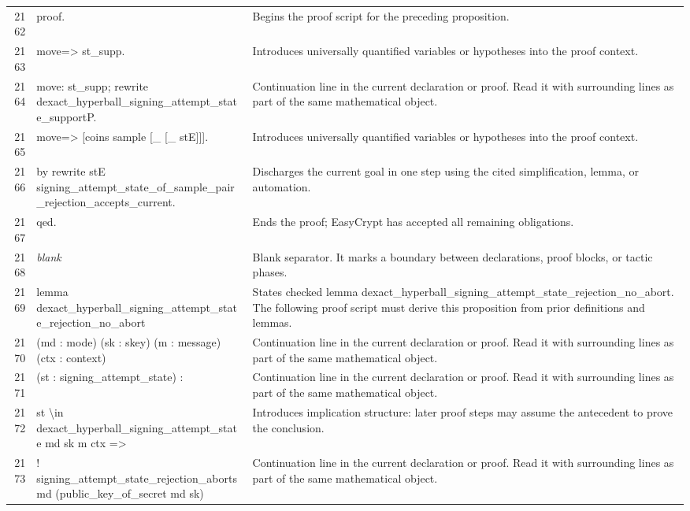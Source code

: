\documentclass[10pt]{article}
\begin{document}
\begin{longtable}{r L{0.53\textwidth} L{0.37\textwidth}}
2162 & {\ttfamily\scriptsize proof.} & Begins the proof script for the preceding proposition. \\
2163 & {\ttfamily\scriptsize move=> st\_supp.} & Introduces universally quantified variables or hypotheses into the proof context. \\
2164 & {\ttfamily\scriptsize move: st\_supp; rewrite dexact\_hyperball\_signing\_attempt\_state\_supportP.} & Continuation line in the current declaration or proof.  Read it with surrounding lines as part of the same mathematical object. \\
2165 & {\ttfamily\scriptsize move=> [coins sample [\_ [\_ stE]]].} & Introduces universally quantified variables or hypotheses into the proof context. \\
2166 & {\ttfamily\scriptsize by rewrite stE signing\_attempt\_state\_of\_sample\_pair\_rejection\_accepts\_current.} & Discharges the current goal in one step using the cited simplification, lemma, or automation. \\
2167 & {\ttfamily\scriptsize qed.} & Ends the proof; EasyCrypt has accepted all remaining obligations. \\
2168 & {\ttfamily\scriptsize \emph{blank}} & Blank separator.  It marks a boundary between declarations, proof blocks, or tactic phases. \\
2169 & {\ttfamily\scriptsize lemma dexact\_hyperball\_signing\_attempt\_state\_rejection\_no\_abort} & States checked lemma dexact\_hyperball\_signing\_attempt\_state\_rejection\_no\_abort.  The following proof script must derive this proposition from prior definitions and lemmas. \\
2170 & {\ttfamily\scriptsize    (md : mode) (sk : skey) (m : message) (ctx : context)} & Continuation line in the current declaration or proof.  Read it with surrounding lines as part of the same mathematical object. \\
2171 & {\ttfamily\scriptsize    (st : signing\_attempt\_state) :} & Continuation line in the current declaration or proof.  Read it with surrounding lines as part of the same mathematical object. \\
2172 & {\ttfamily\scriptsize   st \textbackslash{}in dexact\_hyperball\_signing\_attempt\_state md sk m ctx =>} & Introduces implication structure: later proof steps may assume the antecedent to prove the conclusion. \\
2173 & {\ttfamily\scriptsize   ! signing\_attempt\_state\_rejection\_aborts md (public\_key\_of\_secret md sk)} & Continuation line in the current declaration or proof.  Read it with surrounding lines as part of the same mathematical object. \\

\end{longtable}
\end{document}
